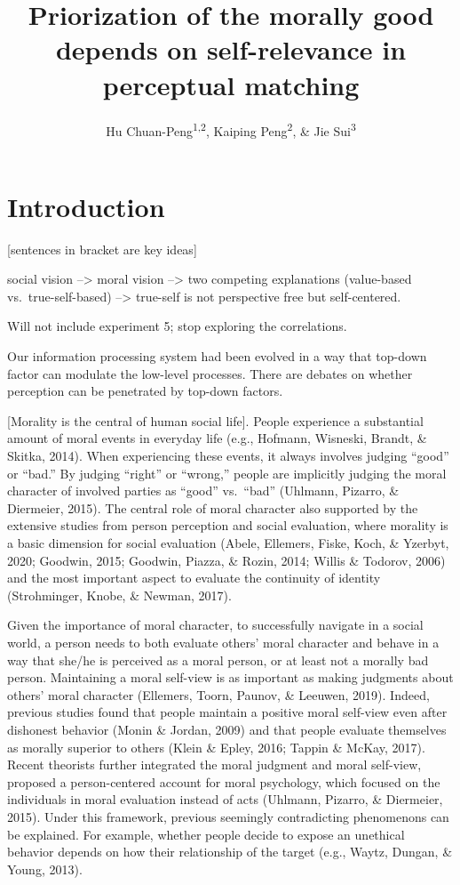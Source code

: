 \documentclass[
  english,
  man]{apa6}
\title{Priorization of the morally good depends on self-relevance in perceptual matching}
\author{Hu Chuan-Peng\textsuperscript{1,2}, Kaiping Peng\textsuperscript{2}, \& Jie Sui\textsuperscript{3}}
\date{}
\affiliation{\vspace{0.5cm}\textsuperscript{1} Nanjing Normal University, 210024 Nanjing, China\\\textsuperscript{2} Tsinghua University, 100084 Beijing, China\\\textsuperscript{3} University of Aberdeen, Aberdeen, Scotland}
\begin{document}
\maketitle

\hypertarget{introduction}{%
\section{Introduction}\label{introduction}}

{[}sentences in bracket are key ideas{]}

social vision --\textgreater{} moral vision --\textgreater{} two competing explanations (value-based vs.~true-self-based) --\textgreater{} true-self is not perspective free but self-centered.

Will not include experiment 5; stop exploring the correlations.

Our information processing system had been evolved in a way that top-down factor can modulate the low-level processes. There are debates on whether perception can be penetrated by top-down factors.

{[}Morality is the central of human social life{]}. People experience a substantial amount of moral events in everyday life (e.g., Hofmann, Wisneski, Brandt, \& Skitka, 2014). When experiencing these events, it always involves judging ``good'' or ``bad.'' By judging ``right'' or ``wrong,'' people are implicitly judging the moral character of involved parties as ``good'' vs.~``bad'' (Uhlmann, Pizarro, \& Diermeier, 2015). The central role of moral character also supported by the extensive studies from person perception and social evaluation, where morality is a basic dimension for social evaluation (Abele, Ellemers, Fiske, Koch, \& Yzerbyt, 2020; Goodwin, 2015; Goodwin, Piazza, \& Rozin, 2014; Willis \& Todorov, 2006) and the most important aspect to evaluate the continuity of identity (Strohminger, Knobe, \& Newman, 2017).

Given the importance of moral character, to successfully navigate in a social world, a person needs to both evaluate others' moral character and behave in a way that she/he is perceived as a moral person, or at least not a morally bad person. Maintaining a moral self-view is as important as making judgments about others' moral character (Ellemers, Toorn, Paunov, \& Leeuwen, 2019). Indeed, previous studies found that people maintain a positive moral self-view even after dishonest behavior (Monin \& Jordan, 2009) and that people evaluate themselves as morally superior to others (Klein \& Epley, 2016; Tappin \& McKay, 2017). Recent theorists further integrated the moral judgment and moral self-view, proposed a person-centered account for moral psychology, which focused on the individuals in moral evaluation instead of acts (Uhlmann, Pizarro, \& Diermeier, 2015). Under this framework, previous seemingly contradicting phenomenons can be explained. For example, whether people decide to expose an unethical behavior depends on how their relationship of the target (e.g., Waytz, Dungan, \& Young, 2013).
\end{document}
